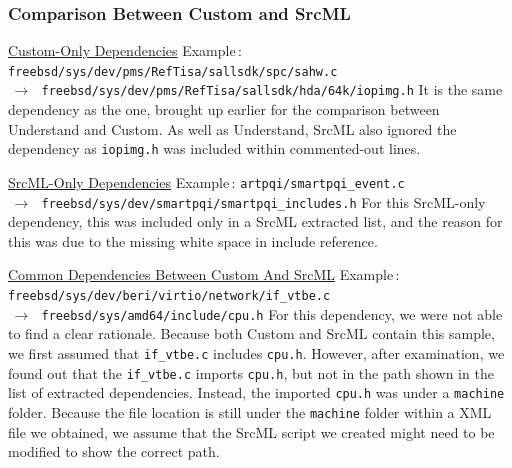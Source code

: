 \documentclass[12pt, dvipsnames, a4paper]{article}
\begin{document}
		\subsubsection{Comparison Between Custom and SrcML}
		\underline{Custom-Only Dependencies}
		\newline
		\newline
		Example$\,\colon\,$\texttt{freebsd/sys/dev/pms/RefTisa/sallsdk/spc/sahw.c \\$\,\to\,$ freebsd/sys/dev/pms/RefTisa/sallsdk/hda/64k/iopimg.h}
		\newline
		\newline
		It is the same dependency as the one, brought up earlier for the comparison between Understand and Custom. As well as Understand, SrcML also ignored the dependency as \texttt{iopimg.h} was included within commented-out lines.

		\underline{SrcML-Only Dependencies}
		\newline
		\newline
		Example$\,\colon\,$\texttt{artpqi/smartpqi\_event.c \\$\,\to\,$ freebsd/sys/dev/smartpqi/smartpqi\_includes.h}
		\newline
		\newline
		For this SrcML-only dependency, this was included only in a SrcML extracted list, and the reason for this was due to the missing white space in include reference.

		\underline{Common Dependencies Between Custom And SrcML}
		\newline
		\newline
		Example$\,\colon\,$\texttt{freebsd/sys/dev/beri/virtio/network/if\_vtbe.c \\$\,\to\,$ freebsd/sys/amd64/include/cpu.h}
		\newline
		\newline
		For this dependency, we were not able to find a clear rationale. Because both Custom and SrcML contain this sample, we first assumed that \texttt{if\_vtbe.c} includes \texttt{cpu.h}. However, after examination, we found out that the \texttt{if\_vtbe.c} imports \texttt{cpu.h}, but not in the path shown in the list of extracted dependencies. Instead, the imported \texttt{cpu.h} was under a \texttt{machine} folder.
		Because the file location is still under the \texttt{machine} folder within a XML file we obtained, we assume that the SrcML script we created might need to be modified to show the correct path.
		\clearpage
\end{document}
